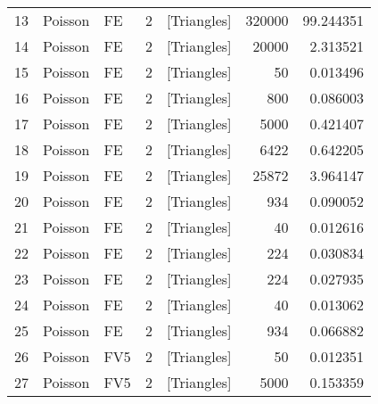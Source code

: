 \begin{tabular}{lllrlrr}
13 &   Poisson &                    FE &               2 &    [Triangles] &                   320000 &                        99.244351 \\
14 &   Poisson &                    FE &               2 &    [Triangles] &                    20000 &                         2.313521 \\
15 &   Poisson &                    FE &               2 &    [Triangles] &                       50 &                         0.013496 \\
16 &   Poisson &                    FE &               2 &    [Triangles] &                      800 &                         0.086003 \\
17 &   Poisson &                    FE &               2 &    [Triangles] &                     5000 &                         0.421407 \\
18 &   Poisson &                    FE &               2 &    [Triangles] &                     6422 &                         0.642205 \\
19 &   Poisson &                    FE &               2 &    [Triangles] &                    25872 &                         3.964147 \\
20 &   Poisson &                    FE &               2 &    [Triangles] &                      934 &                         0.090052 \\
21 &   Poisson &                    FE &               2 &    [Triangles] &                       40 &                         0.012616 \\
22 &   Poisson &                    FE &               2 &    [Triangles] &                      224 &                         0.030834 \\
23 &   Poisson &                    FE &               2 &    [Triangles] &                      224 &                         0.027935 \\
24 &   Poisson &                    FE &               2 &    [Triangles] &                       40 &                         0.013062 \\
25 &   Poisson &                    FE &               2 &    [Triangles] &                      934 &                         0.066882 \\
26 &   Poisson &                   FV5 &               2 &    [Triangles] &                       50 &                         0.012351 \\
27 &   Poisson &                   FV5 &               2 &    [Triangles] &                     5000 &                         0.153359 \\

\end{tabular}
